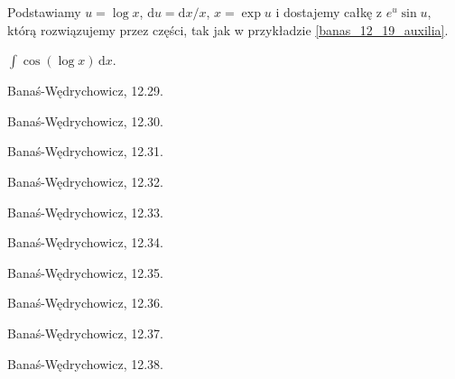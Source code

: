\begin{solution}
    Podstawiamy $u = \log x$, $\mathrm{d} u = \mathrm{d} x / x$, $x = \exp u$ i dostajemy całkę z $e^u \sin u$, którą rozwiązujemy przez części, tak jak w przykładzie \ref{banas_12_19_auxilia}.
\end{solution}

\begin{problem}
    \label{banas_12_20}%
    $\int \cos(\log x) \, \mathrm{d}x$.
\end{problem}    

\begin{problem}
    Banaś-Wędrychowicz, 12.29.
\end{problem}

\begin{problem}
    Banaś-Wędrychowicz, 12.30.
\end{problem}

\begin{problem}
    Banaś-Wędrychowicz, 12.31.
\end{problem}

\begin{problem}
    Banaś-Wędrychowicz, 12.32.
\end{problem}

\begin{problem}
    Banaś-Wędrychowicz, 12.33.
\end{problem}

\begin{problem}
    Banaś-Wędrychowicz, 12.34.
\end{problem}

\begin{problem}
    Banaś-Wędrychowicz, 12.35.
\end{problem}

\begin{problem}
    Banaś-Wędrychowicz, 12.36.
\end{problem}

\begin{problem}
    Banaś-Wędrychowicz, 12.37.
\end{problem}

\begin{problem}
    Banaś-Wędrychowicz, 12.38.
\end{problem}


